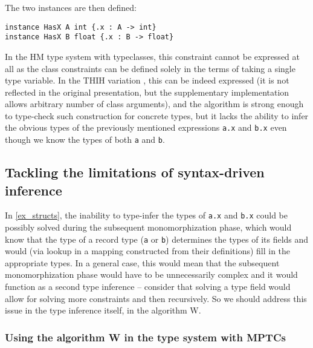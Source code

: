The two instances are then defined:

\begin{lstlisting}
instance HasX A int {.x : A -> int}
instance HasX B float {.x : B -> float}
\end{lstlisting}

In the HM type system with typeclasses, this constraint cannot be expressed at all as the class constraints can be defined solely in the terms of taking a single type variable. In the THIH variation \cite{jones1999typing}, this can be indeed expressed (it is not reflected in the original presentation, but the supplementary implementation allows arbitrary number of class arguments), and the algorithm is strong enough to type-check such construction for concrete types, but it lacks the ability to infer the obvious types of the previously mentioned expressions \lstinline{a.x} and \lstinline{b.x} even though we know the types of both \lstinline{a} and \lstinline{b}.

\subsection{Tackling the limitations of syntax-driven inference}
\label{sec:tackle}

In \cref{ex_structs}, the inability to type-infer the types of \lstinline{a.x} and \lstinline{b.x} could be possibly solved during the subsequent monomorphization phase, which would know that the type of a record type (\lstinline{a} or \lstinline{b}) determines the types of its fields and would (via lookup in a mapping constructed from their definitions) fill in the appropriate types. In a general case, this would mean that the subsequent monomorphization phase would have to be unnecessarily complex and it would function as a second type inference -- consider that solving a type field would allow for solving more constraints and then recursively. So we should address this issue in the type inference itself, in the algorithm W.

\subsubsection{Using the algorithm W in the type system with MPTCs}

